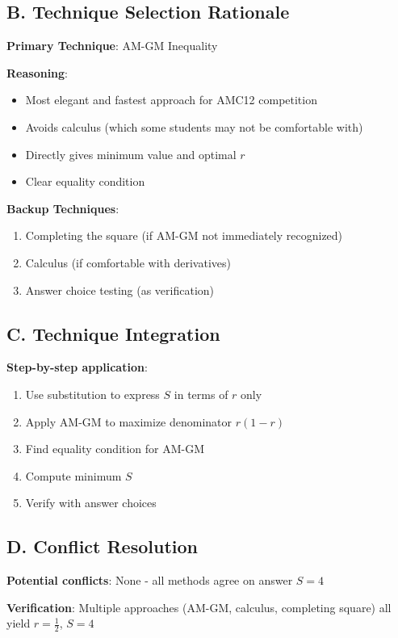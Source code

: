 \documentclass[12pt]{article}
\begin{document}
\begin{conversionbox}
\subsection*{B. Technique Selection Rationale}

\textbf{Primary Technique}: AM-GM Inequality

\textbf{Reasoning}:
\begin{itemize}[leftmargin=*]
    \item Most elegant and fastest approach for AMC12 competition
    \item Avoids calculus (which some students may not be comfortable with)
    \item Directly gives minimum value and optimal $r$
    \item Clear equality condition
\end{itemize}

\textbf{Backup Techniques}:
\begin{enumerate}
    \item Completing the square (if AM-GM not immediately recognized)
    \item Calculus (if comfortable with derivatives)
    \item Answer choice testing (as verification)
\end{enumerate}

\subsection*{C. Technique Integration}

\textbf{Step-by-step application}:
\begin{enumerate}
    \item Use substitution to express $S$ in terms of $r$ only
    \item Apply AM-GM to maximize denominator $r(1-r)$
    \item Find equality condition for AM-GM
    \item Compute minimum $S$
    \item Verify with answer choices
\end{enumerate}

\subsection*{D. Conflict Resolution}

\textbf{Potential conflicts}: None - all methods agree on answer $S = 4$

\textbf{Verification}: Multiple approaches (AM-GM, calculus, completing square) all yield $r = \frac{1}{2}$, $S = 4$
\end{conversionbox}
\end{document}
